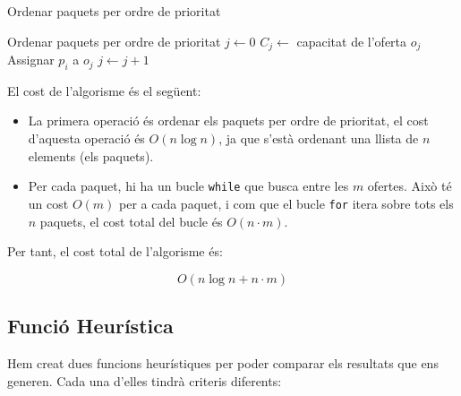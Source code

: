 \documentclass[a4paper]{article}
\begin{document}
	\begin{algorithm} [H]
		\caption{Ordenar paquets per ordre de prioritat}
		\begin{algorithmic}[1]
			\State Ordenar paquets per ordre de prioritat
			\State $j \gets 0$
			\State $C_j \gets$ capacitat de l'oferta $o_j$
			\State Assignar $p_i$ a $o_j$
			\Else
			\State $j \gets j + 1$ 
			\EndIf
			\EndWhile
			\EndFor
		\end{algorithmic}
	\end{algorithm}
	
	El cost de l'algorisme és el següent:
	
	\begin{itemize}
		\item La primera operació és ordenar els paquets per ordre de prioritat, el cost d'aquesta operació és $O(n \log n)$, ja que s'està ordenant una llista de $n$ elements (els paquets).
		\item Per cada paquet, hi ha un bucle \texttt{while} que busca entre les $m$ ofertes. Això té un cost $O(m)$ per a cada paquet, i com que el bucle \texttt{for} itera sobre tots els $n$ paquets, el cost total del bucle és $O(n \cdot m)$.
	\end{itemize}
	
	Per tant, el cost total de l'algorisme és:
	
	\[
	O(n \log n + n \cdot m)
	\]
		
	\subsection{Funció Heurística}
	
	Hem creat dues funcions heurístiques per poder comparar els resultats que ens generen. Cada una d'elles tindrà criteris diferents:
	
\end{document}
